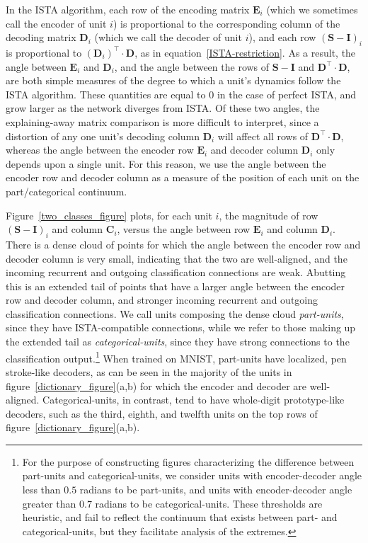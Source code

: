 \documentclass{article} %
\newcommand{\C}{\mathbf{C}}
\newcommand{\D}{\mathbf{D}}
\newcommand{\E}{\mathbf{E}}
\newcommand{\I}{\mathbf{I}}
\newcommand{\Sm}{\mathbf{S}}
\begin{document}
In the ISTA algorithm, each row of the encoding matrix $\E_i$ (which we sometimes call the encoder of unit $i$) is proportional to the corresponding column of the decoding matrix $\D_i$ (which we call the decoder of unit $i$), and each row $\left( \Sm - \I \right)_i$ is proportional to $\left( \D_i \right)^\top \cdot \D$, as in equation~\ref{ISTA-restriction}.  As a result, the angle between $\E_i$ and $\D_i$, and the angle between the rows of $\Sm - \I$ and $\D^{\top} \cdot \D$, are both simple measures of the degree to which a unit's dynamics follow the ISTA algorithm.  These quantities are equal to $0$ in the case of perfect ISTA, and grow larger as the network diverges from ISTA.
Of these two angles, the explaining-away matrix comparison is more difficult to interpret, since a distortion of any one unit's decoding column $\D_i$ will affect all rows of $\D^{\top} \cdot \D$, whereas the angle between the encoder row $\E_i$ and decoder column $\D_i$ only depends upon a single unit. For this reason, we use the angle between the encoder row and decoder column as a measure of the position of each unit on the part/categorical continuum.  %

Figure~\ref{two_classes_figure} plots, for each unit $i$, the magnitude of row $\left( \Sm - \I \right)_i$ and column $\C_i$, versus the angle between row $\E_i$ and column $\D_i$.
There is a dense cloud of points for which the angle between the encoder row and decoder column is very small, indicating that the two are well-aligned, and the incoming recurrent and outgoing classification connections are weak.  Abutting this is an extended tail of points that have a larger angle between the encoder row and decoder column, and stronger incoming recurrent and outgoing classification connections.  We call units composing the dense cloud \emph{part-units}, since they have ISTA-compatible connections, while we refer to those making up the extended tail as \emph{categorical-units}, since they have strong connections to the classification output.\footnote{For the purpose of constructing figures characterizing the difference between part-units and categorical-units, we consider units with encoder-decoder angle less than $0.5$ radians to be part-units, and units with encoder-decoder angle greater than $0.7$ radians to be categorical-units.  These thresholds are heuristic, and fail to reflect the continuum that exists between part- and categorical-units, but they facilitate analysis of the extremes.}  When trained on MNIST, part-units have localized, pen stroke-like decoders, as can be seen in the majority of the units in figure~\ref{dictionary_figure}(a,b) for which the encoder and decoder are well-aligned.  Categorical-units, in contrast, tend to have whole-digit prototype-like decoders, such as the third, eighth, and twelfth units on the top rows of figure~\ref{dictionary_figure}(a,b).
\end{document}
